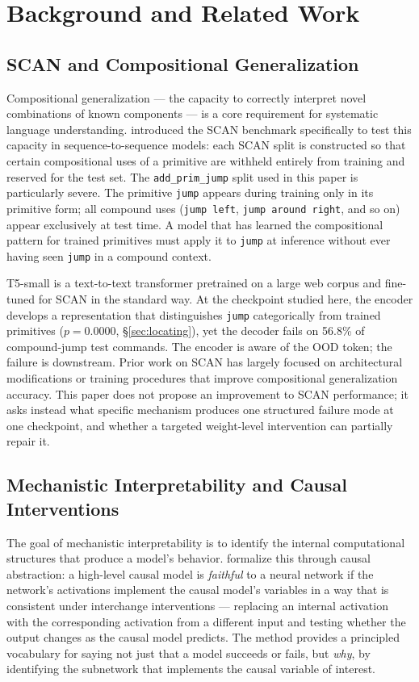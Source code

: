 \section{Background and Related Work}
\label{sec:background}

\subsection{SCAN and Compositional Generalization}

Compositional generalization --- the capacity to correctly interpret novel
combinations of known components --- is a core requirement for systematic
language understanding.
\citet{lake2018scan} introduced the SCAN benchmark specifically to test this
capacity in sequence-to-sequence models: each SCAN split is constructed so
that certain compositional uses of a primitive are withheld entirely from
training and reserved for the test set.
The \texttt{add\_prim\_jump} split used in this paper is particularly severe.
The primitive \texttt{jump} appears during training only in its primitive
form; all compound uses (\texttt{jump left}, \texttt{jump around right},
and so on) appear exclusively at test time.
A model that has learned the compositional pattern for trained primitives
must apply it to \texttt{jump} at inference without ever having seen
\texttt{jump} in a compound context.

T5-small \citep{raffel2020t5} is a text-to-text transformer pretrained on
a large web corpus and fine-tuned for SCAN in the standard way.
At the checkpoint studied here, the encoder develops a representation that
distinguishes \texttt{jump} categorically from trained primitives
($p=0.0000$, \S\ref{sec:locating}), yet the decoder fails on 56.8\% of
compound-jump test commands.
The encoder is aware of the OOD token; the failure is downstream.
Prior work on SCAN has largely focused on architectural modifications or
training procedures that improve compositional generalization accuracy.
This paper does not propose an improvement to SCAN performance; it asks
instead what specific mechanism produces one structured failure mode at one
checkpoint, and whether a targeted weight-level intervention can partially
repair it.

\subsection{Mechanistic Interpretability and Causal Interventions}

The goal of mechanistic interpretability is to identify the internal
computational structures that produce a model's behavior.
\citet{geiger2021causal} formalize this through causal abstraction: a
high-level causal model is \emph{faithful} to a neural network if the
network's activations implement the causal model's variables in a way
that is consistent under interchange interventions --- replacing an
internal activation with the corresponding activation from a different
input and testing whether the output changes as the causal model predicts.
The method provides a principled vocabulary for saying not just that a model
succeeds or fails, but \emph{why}, by identifying the subnetwork that
implements the causal variable of interest.

